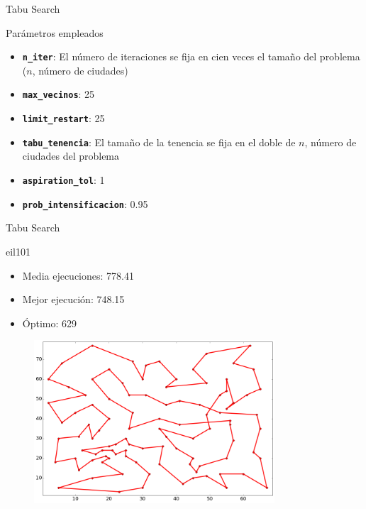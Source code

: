 \documentclass[ignorenonframetext,]{beamer}
\begin{document}
\begin{frame}{Tabu Search}

\begin{block}{Parámetros empleados}

\begin{itemize}
\item
  \textbf{\texttt{n\_iter}}: El número de iteraciones se fija en cien
  veces el tamaño del problema ($n$, número de ciudades)
\item
  \textbf{\texttt{max\_vecinos}}: 25
\item
  \textbf{\texttt{limit\_restart}}: 25
\item
  \textbf{\texttt{tabu\_tenencia}}: El tamaño de la tenencia se fija en
  el doble de $n$, número de ciudades del problema
\item
  \textbf{\texttt{aspiration\_tol}}: 1
\item
  \textbf{\texttt{prob\_intensificacion}}: 0.95
\end{itemize}

\end{block}

\end{frame}

\begin{frame}{Tabu Search}

\begin{block}{eil101}

\begin{itemize}
\item
  Media ejecuciones: 778.41
\item
  Mejor ejecución: 748.15
\item
  Óptimo: 629
\end{itemize}

\begin{figure}[htbp]
\centering
\includegraphics[width=0.8\textwidth]{./images/eil101ts.png}
\end{figure}

\end{block}

\end{frame}
\end{document}
